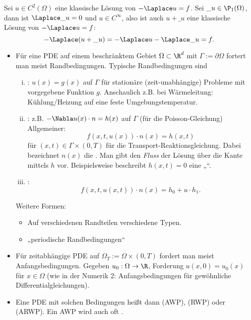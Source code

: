 \begin{df}
\begin{note}[Wohlgestelltheit]
\begin{itemize}
				Sei $u \in C^2(\Omega)$ eine klassische Lösung von $-\Laplace u = f$.
				Sei $\_u \in \P_1(\Omega)$, dann ist $\Laplace \_u = 0$ und $u \in C^\infty$, also ist auch $u + \_u$ eine klassische Lösung von $-\Laplace u = f$:
				\[
					- \Laplace(u + \_u) = - \Laplace u - \Laplace \_u = f.
				\]
		\end{itemize}
	\end{note}
	\begin{note}
		\begin{itemize}
			\item
				Für eine PDE auf einem beschränktem Gebiet $\Omega \subset \R^d$ mit $\Gamma := \partial \Omega$ fortert man meist Randbedingungen.
				Typische Randbedingungen sind
				\begin{enumerate}[i)]
					\item
						: $u(x) = g(x)$ auf $\Gamma$ für stationäre (zeit-unabhängige) Probleme mit vorgegebene Funktion $g$.
						Anschaulich z.B. bei Wärmeleitung: Kühlung/Heizung auf eine feste Umgebungstemperatur.
					\item
						: z.B. $- \Nabla u(x) \cdot n = h(x)$ auf $\Gamma$ (für die Poisson-Gleichung)
						Allgemeiner:
						\[
							f(x,t,u(x)) \cdot n(x) = h(x,t)
						\]
						für $(x, t) \in \Gamma \times (0,T)$ für die Transport-Reaktionsgleichung.
						Dabei bezeichnet $n(x)$ die .
						Man gibt den \emph{Fluss} der Lösung über die Kante mittels $h$ vor.
						Beispielsweise beschreibt $h(x,t) = 0$ eine „“.
					\item
						:
						\[
							f(x, t, u(x,t)) \cdot n(x) = h_0 + u \cdot h_1.
						\]
				\end{enumerate}
				Weitere Formen:
				\begin{itemize}
					\item
						Auf verschiedenen Randteilen verschiedene Typen.
					\item
						„periodische Randbedingungen“
				\end{itemize}
			\item
				Für zeitabhängige PDE auf $\Omega_T := \Omega \times (0,T)$ fordert man meist Anfangsbedingungen.
				Gegeben $u_0: \Omega \to \R$, Forderung $u(x, 0) = u_0(x)$ für $x \in \Omega$ (wie in der Numerik 2: Anfangsbedingungen für gewöhnliche Differentialgleichungen).
			\item
				Eine PDE mit solchen Bedingungen heißt dann  (AWP),  (RWP) oder  (ARWP).
				Ein AWP wird auch oft .
		\end{itemize}
	\end{note}
\end{df}

